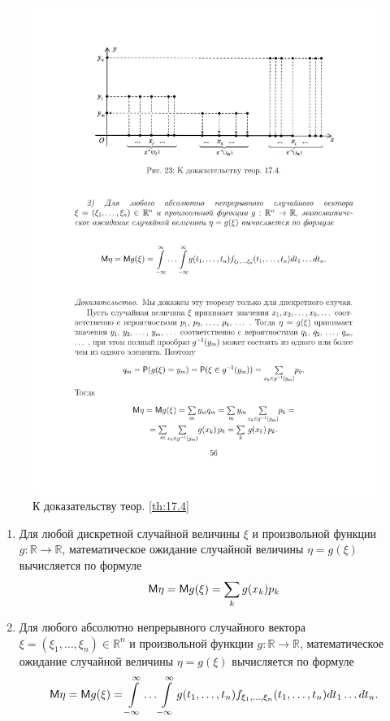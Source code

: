 \begin{figure}[H]
	\centering
	\includegraphics[]{pic/pic23}
	\caption{К доказательству теор. \ref{th:17.4}}
	\label{fig23}
\end{figure}
\begin{theorem}
\label{th:17.4}
\begin{enumerate}
	\item Для любой дискретной случайной величины $\xi$ и произвольной функции $g : \mathbb{R} \to \mathbb{R}$, математическое ожидание случайной величины $\eta = g(\xi)$ вычисляется по формуле
		\begin{equation*}
			\mathsf{M}\eta=\mathsf{M} g(\xi)=\sum_k g(x_k)p_k
		\end{equation*}
	\item Для любого абсолютно непрерывного случайного вектора
	$\xi = (\xi_1, \ldots, \xi_n) \in \mathbb{R}^n$ и произвольной функции 
	$g : \mathbb{R} \to \mathbb{R}$, математическое ожидание случайной величины 
	$\eta = g(\xi)$ вычисляется по формуле
		\begin{equation*}
			\mathsf{M}\eta=\mathsf{M} g(\xi)=\int\limits_{-\infty}^{\infty}\ldots
			\int\limits_{-\infty}^{\infty}g(t_1,\ldots,t_n)f_{\xi_1,\ldots,\xi_n}(t_1,\ldots,t_n)dt_1\ldots dt_n.
		\end{equation*}
\end{enumerate}

\end{theorem}

